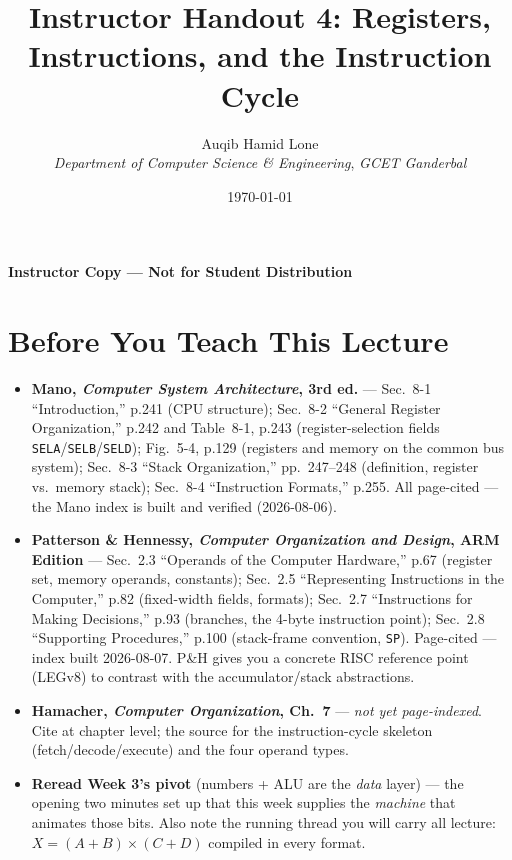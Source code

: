 \documentclass[11pt]{article}
\title{Instructor Handout 4: Registers, Instructions, and the Instruction Cycle}
\author{Auqib Hamid Lone\\[0.3em]
  \emph{Department of Computer Science \& Engineering}, \emph{GCET Ganderbal}}
\date{\today}
\begin{document}
\maketitle
{\centering\large\color{negative}\textbf{Instructor Copy --- Not for Student Distribution}\par}
\vspace{0.5cm}

\section{Before You Teach This Lecture}

\begin{itemize}
  \item \textbf{Mano, \textit{Computer System Architecture}, 3rd ed.} --- Sec.~8-1 ``Introduction,'' p.241 (CPU structure); Sec.~8-2 ``General Register Organization,'' p.242 and Table~8-1, p.243 (register-selection fields \texttt{SELA}/\texttt{SELB}/\texttt{SELD}); Fig.~5-4, p.129 (registers and memory on the common bus system); Sec.~8-3 ``Stack Organization,'' pp.~247--248 (definition, register vs.\ memory stack); Sec.~8-4 ``Instruction Formats,'' p.255. All page-cited --- the Mano index is built and verified (2026-08-06).
  \item \textbf{Patterson \& Hennessy, \textit{Computer Organization and Design}, ARM Edition} --- Sec.~2.3 ``Operands of the Computer Hardware,'' p.67 (register set, memory operands, constants); Sec.~2.5 ``Representing Instructions in the Computer,'' p.82 (fixed-width fields, formats); Sec.~2.7 ``Instructions for Making Decisions,'' p.93 (branches, the 4-byte instruction point); Sec.~2.8 ``Supporting Procedures,'' p.100 (stack-frame convention, \texttt{SP}). Page-cited --- index built 2026-08-07. P\&H gives you a concrete RISC reference point (LEGv8) to contrast with the accumulator/stack abstractions.
  \item \textbf{Hamacher, \textit{Computer Organization}, Ch.~7} --- \emph{not yet page-indexed}. Cite at chapter level; the source for the instruction-cycle skeleton (fetch/decode/execute) and the four operand types.
  \item \textbf{Reread Week 3's pivot} (numbers + ALU are the \emph{data} layer) --- the opening two minutes set up that this week supplies the \emph{machine} that animates those bits. Also note the running thread you will carry all lecture: $X = (A+B)\times(C+D)$ compiled in every format.
\end{itemize}
\end{document}
